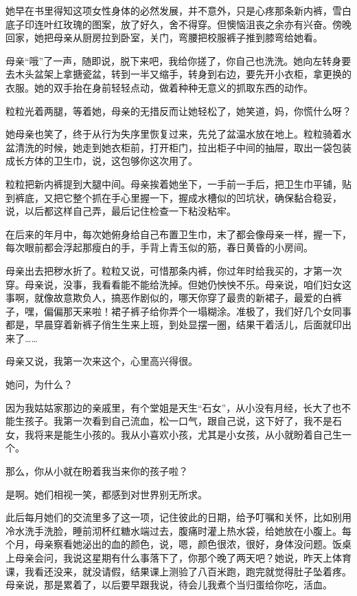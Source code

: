 \documentclass[lang=cn,newtx,12pt,scheme=chinese]{elegantbook}
\begin{document}
她早在书里得知这项女性身体的必然发展，并不意外，只是心疼那条新内裤，雪白底子印连叶红玫瑰的图案，放了好久，舍不得穿。但懊恼沮丧之余亦有兴奋。傍晚回家，她把母亲从厨房拉到卧室，关门，弯腰把校服裤子推到膝弯给她看。

母亲“哦”了一声，随即说，脱下来吧，我给你搓了，你自己也洗洗。她向左转身要去木头盆架上拿搪瓷盆，转到一半又缩手，转身到右边，要先开小衣柜，拿更换的衣服。她的双手抬在身前轻轻点动，做着种种无意义的抓取东西的动作。

粒粒光着两腿，等着她，母亲的无措反而让她轻松了，她笑道，妈，你慌什么呀？

她母亲也笑了，终于从行为失序里恢复过来，先兑了盆温水放在地上。粒粒骑着水盆清洗的时候，她走到她衣柜前，打开柜门，拉出柜子中间的抽屉，取出一袋包装成长方体的卫生巾，说，这包够你这次用了。

粒粒把新内裤提到大腿中间。母亲挨着她坐下，一手前一手后，把卫生巾平铺，贴到裤底，又把它整个抓在手心里握一下，握成水槽似的凹坑状，确保黏合稳妥，说，以后都这样自己弄，最后记住检查一下粘没粘牢。

在后来的年月中，每次她俯身给自己布置卫生巾，末了都会像母亲一样，握一下，每次眼前都会浮起那瘦白的手，手背上青玉似的筋，春日黄昏的小房间。

母亲出去把秽水折了。粒粒又说，可惜那条内裤，你过年时给我买的，才第一次穿。母亲说，没事，我看看能不能给洗掉。但她仍怏怏不乐。母亲说，咱们妇女这事啊，就像故意欺负人，搞恶作剧似的，哪天你穿了最贵的新裙子，最爱的白裤子，嘿，偏偏那天来啦！裙子裤子给你弄个一塌糊涂。准极了，我们好几个女同事都是，早晨穿着新裤子俏生生来上班，到处显摆一圈，结果干着活儿，后面就印出来了……

母亲又说，我第一次来这个，心里高兴得很。

她问，为什么？

因为我姑姑家那边的亲戚里，有个堂姐是天生“石女”，从小没有月经，长大了也不能生孩子。我第一次看到自己流血，松一口气，跟自己说，这下好了，我不是石女，我将来是能生小孩的。我从小喜欢小孩，尤其是小女孩，从小就盼着自己生一个。

那么，你从小就在盼着我当来你的孩子啦？

是啊。她们相视一笑，都感到对世界别无所求。

此后每月她们的交流里多了这一项，记住彼此的日期，给予叮嘱和关怀，比如别用冷水洗手洗脸，睡前沏杯红糖水端过去，腹痛时灌上热水袋，给她放在小腹上。每个月，母亲察看她泌出的血的颜色，说，嗯，颜色很浓，很好，身体没问题。饭桌上母亲会问，我说这星期有什么事落下了，你那个晚了两天吧？她说，昨天上体育课，我看还没来，就没请假，结果课上测验了八百米跑，跑完就觉得肚子坠着疼。母亲说，那是累着了，以后要早跟我说，待会儿我煮个当归蛋给你吃，活血。
\end{document}
